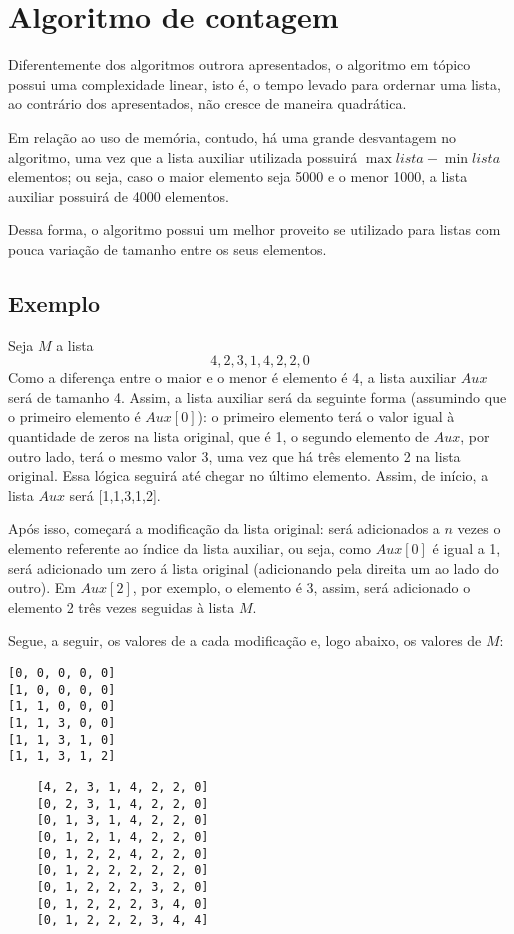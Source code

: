\section{Algoritmo de contagem}
Diferentemente dos algoritmos outrora apresentados, o algoritmo em tópico possui uma complexidade linear, isto é, o tempo levado para ordernar uma lista, ao contrário dos apresentados, não cresce de maneira quadrática. 

Em relação ao uso de memória, contudo, há uma grande desvantagem no algoritmo, uma vez que a lista auxiliar utilizada possuirá $\max{lista}-\min{lista} $ elementos; ou seja, caso o maior elemento seja 5000 e o menor 1000, a lista auxiliar possuirá de 4000 elementos.

Dessa forma, o algoritmo possui um melhor proveito se utilizado para listas com pouca variação de tamanho entre os seus elementos.

\subsection{Exemplo}
Seja $M$ a lista \[4,2,3,1,4,2,2,0\] Como a diferença entre o maior e o menor é elemento é 4, a lista auxiliar $Aux$ será de tamanho 4.
Assim, a lista auxiliar será da seguinte forma (assumindo que o primeiro elemento é $Aux[0]$): o primeiro elemento terá o valor igual à quantidade de zeros na lista original, que é 1, o segundo elemento de $Aux$, por outro lado, terá o mesmo valor 3, uma vez que há três elemento 2 na lista original. Essa lógica seguirá até chegar no último elemento.
Assim, de início, a lista $Aux$ será [1,1,3,1,2].

Após isso, começará a modificação da lista original: será adicionados a $n$ vezes o elemento referente ao índice da lista auxiliar, ou seja, como $Aux[0]$ é igual a 1, será adicionado um zero á lista original (adicionando pela direita um ao lado do outro). Em $Aux[2]$, por exemplo, o elemento é 3, assim, será adicionado o elemento 2 três vezes seguidas à lista $M$.

Segue, a seguir, os valores de  a cada modificação e, logo abaixo, os valores de $M$:
\begin{lstlisting}
[0, 0, 0, 0, 0]
[1, 0, 0, 0, 0]
[1, 1, 0, 0, 0]
[1, 1, 3, 0, 0]
[1, 1, 3, 1, 0]
[1, 1, 3, 1, 2]
\end{lstlisting}

\begin{lstlisting}
    [4, 2, 3, 1, 4, 2, 2, 0]
    [0, 2, 3, 1, 4, 2, 2, 0]
    [0, 1, 3, 1, 4, 2, 2, 0]
    [0, 1, 2, 1, 4, 2, 2, 0]
    [0, 1, 2, 2, 4, 2, 2, 0]
    [0, 1, 2, 2, 2, 2, 2, 0]
    [0, 1, 2, 2, 2, 3, 2, 0]
    [0, 1, 2, 2, 2, 3, 4, 0]
    [0, 1, 2, 2, 2, 3, 4, 4] 
\end{lstlisting}

